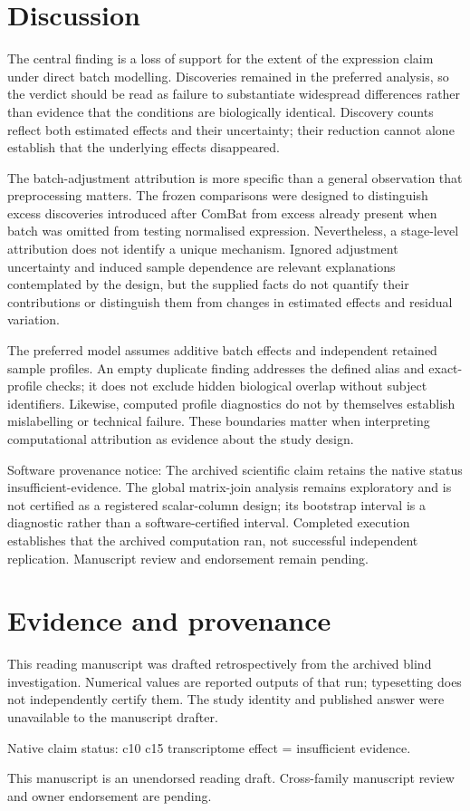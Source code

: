\documentclass[10pt,a4paper]{article}
\begin{document}
\section*{Discussion}
The central finding is a loss of support for the extent of the expression claim under direct batch modelling. Discoveries remained in the preferred analysis, so the verdict should be read as failure to substantiate widespread differences rather than evidence that the conditions are biologically identical. Discovery counts reflect both estimated effects and their uncertainty; their reduction cannot alone establish that the underlying effects disappeared.
\par
The batch-adjustment attribution is more specific than a general observation that preprocessing matters. The frozen comparisons were designed to distinguish excess discoveries introduced after ComBat from excess already present when batch was omitted from testing normalised expression. Nevertheless, a stage-level attribution does not identify a unique mechanism. Ignored adjustment uncertainty and induced sample dependence are relevant explanations contemplated by the design, but the supplied facts do not quantify their contributions or distinguish them from changes in estimated effects and residual variation.
\par
The preferred model assumes additive batch effects and independent retained sample profiles. An empty duplicate finding addresses the defined alias and exact-profile checks; it does not exclude hidden biological overlap without subject identifiers. Likewise, computed profile diagnostics do not by themselves establish mislabelling or technical failure. These boundaries matter when interpreting computational attribution as evidence about the study design.
\par
Software provenance notice: The archived scientific claim retains the native status insufficient-evidence. The global matrix-join analysis remains exploratory and is not certified as a registered scalar-column design; its bootstrap interval is a diagnostic rather than a software-certified interval. Completed execution establishes that the archived computation ran, not successful independent replication. Manuscript review and endorsement remain pending.
\par
\section*{Evidence and provenance}
This reading manuscript was drafted retrospectively from the archived blind investigation. Numerical values are reported outputs of that run; typesetting does not independently certify them. The study identity and published answer were unavailable to the manuscript drafter.
\par
Native claim status: c10 c15 transcriptome effect = insufficient evidence.
\par
This manuscript is an unendorsed reading draft. Cross-family manuscript review and owner endorsement are pending.
\par
\end{document}
